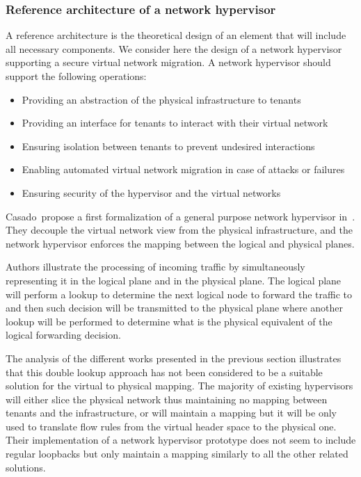 \subsubsection{Reference architecture of a network hypervisor}
\label{sec:reference_archi}
A reference architecture is the theoretical design of an element that will include all necessary components. 
We consider here the design of a network hypervisor supporting a secure virtual network migration.
A network hypervisor should support the following operations:
\begin{itemize}
    \item Providing an abstraction of the physical infrastructure to tenants
    \item Providing an interface for tenants to interact with their virtual network
    \item Ensuring isolation between tenants to prevent undesired interactions 
    \item Enabling automated virtual network migration in case of attacks or failures
    \item Ensuring security of the hypervisor and the virtual networks
\end{itemize}

Casado~\etal propose a first formalization of a general purpose network hypervisor in~\cite{Netvirt_Definition-Casado2010}. They decouple the virtual network view from the physical infrastructure, and the network hypervisor enforces the mapping between the logical and physical planes.

Authors illustrate the processing of incoming traffic by simultaneously representing it in the logical plane and in the physical plane.
The logical plane will perform a lookup to determine the next logical node to forward the traffic to and then such decision will be transmitted to the physical plane where another lookup will be performed to determine what is the physical equivalent of the logical forwarding decision.

The analysis of the different works presented in the previous section illustrates that this double lookup approach has not been considered to be a suitable solution for the virtual to physical mapping. The majority of existing hypervisors will either slice the physical network thus maintaining no mapping between tenants and the infrastructure, or will maintain a mapping but it will be only used to translate flow rules from the virtual header space to the physical one. Their implementation of a network hypervisor prototype does not seem to include regular loopbacks but only maintain a mapping similarly to all the other related solutions.

